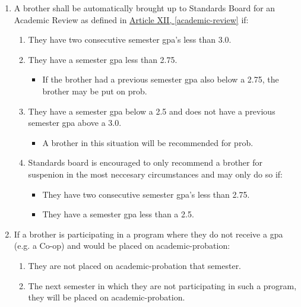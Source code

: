\begin{enumerate}
\begin{enumerate}
			\item A brother shall be automatically brought up to Standards Board for an Academic Review as defined in \hyperref[academic-review]{Article XII, \autoref*{academic-review}} if:
			\begin{enumerate}
				\item They have two consecutive semester \gls{gpa}'s less than 3.0.
				\item They have a semester \gls{gpa} less than 2.75.
				\begin{itemize}
					\item If the brother had a previous semester \gls{gpa} also below a 2.75, the brother may be put on \gls{prob}.
				\end{itemize}
				\item They have a semester \gls{gpa} below a 2.5 and does not have a previous semester \gls{gpa} above a 3.0.
				\begin{itemize}
					\item A brother in this situation will be recommended for \gls{prob}.
				\end{itemize}
				\item Standards board is encouraged to only recommend a brother for suspenion in the most neccesary circumstances and may only do so if:
				\begin{itemize}
					\item They have two consecutive semester \gls{gpa}'s less than 2.75.
					\item They have a semester \gls{gpa} less than a 2.5.
				\end {itemize}

			\end{enumerate}

		\item If a brother is participating in a program where they do not receive a \gls{gpa} (e.g. a Co-op) and would be placed on \gls{academic-probation}:
			\begin{enumerate}
				\item They are not placed on \gls{academic-probation} that semester.
				\item The next semester in which they are not participating in such a program, they will be placed on \gls{academic-probation}.
			\end{enumerate}

		\end{enumerate}
	\end{enumerate}


